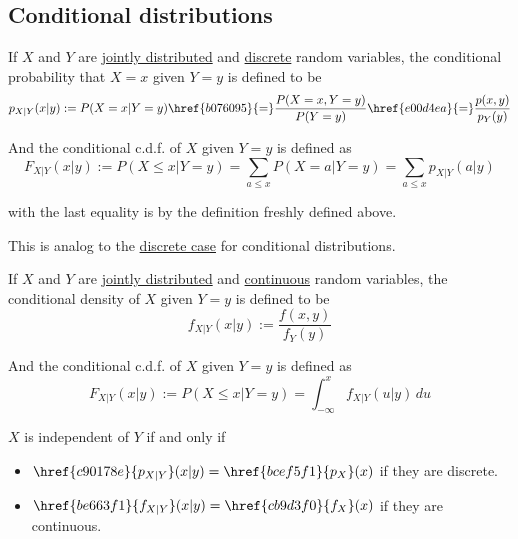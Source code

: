 \subsection{Conditional distributions}\label{af50b2f}

\label{c90178e}

If $X$ and $Y$ are \href{ab5a852}{jointly distributed} and
\href{f831030}{discrete} random variables, the conditional probability that
$X=x$ given $Y=y$ is defined to be
$$
  p_{X|Y}(x|y):=P(X=x|Y=y)\href{b076095}{=}\frac{P(X=x,Y=y)}{P(Y=y)}\href{e00d4ea}{=}\frac{p(x,y)}{p_Y(y)}
$$

And the conditional c.d.f. of $X$ given $Y=y$ is defined as
$$
  F_{X|Y}(x|y):=P(X\leq x|Y=y)=\sum_{a\leq x}P(X=a|Y=y)=\sum_{a\leq x}p_{X|Y}(a|y)
$$

with the last equality is by the definition freshly defined above.

\label{be663f1}

This is analog to the \href{c90178e}{discrete case} for conditional
distributions.

If $X$ and $Y$ are \href{ab5a852}{jointly distributed} and
\href{bdb1e15}{continuous} random variables, the conditional density of $X$
given $Y=y$ is defined to be
$$
  f_{X|Y}(x|y):=\frac{f(x,y)}{f_Y(y)}
$$

And the conditional c.d.f. of $X$ given $Y=y$ is defined as
$$
  F_{X|Y}(x|y):=P(X\leq x|Y=y)=\int_{-\infty}^xf_{X|Y}(u|y)\,du
$$

\label{bdaa2fc}

$X$ is independent of $Y$ if and only if
\begin{itemize}
  \item $\href{c90178e}{p_{X|Y}}(x|y)=\href{bcef5f1}{p_X}(x)$ if they are
        discrete.
  \item $\href{be663f1}{f_{X|Y}}(x|y)=\href{cb9d3f0}{f_X}(x)$ if they are
        continuous.
\end{itemize}

